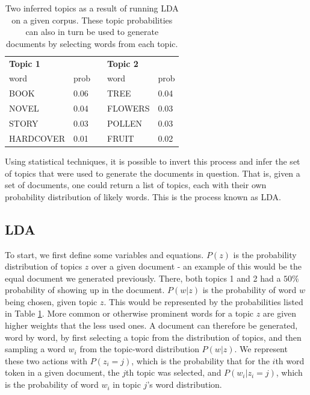 \documentclass[a4paper]{article}
\begin{document}
\begin{table}[h]
  \centering %
  \begin{tabular}{ |l|l|l|l|l| }
    \cline{0-1}
    \cline{4-5}
    \multicolumn{2}{|l|}{\textbf{Topic 1}} & & \multicolumn{2}{|l|}{\textbf{Topic 2}} \\
    \cline{0-1}
    \cline{4-5}
    word & prob & & word & prob \\
    \cline{0-1}
    \cline{4-5}
    BOOK & 0.06 & & TREE & 0.04 \\
    NOVEL & 0.04 & & FLOWERS & 0.03 \\
    STORY & 0.03 & & POLLEN & 0.03 \\
    HARDCOVER & 0.01 & & FRUIT & 0.02 \\
    \cline{0-1}
    \cline{4-5}
  \end{tabular}
  \caption{Two inferred topics as a result of running LDA on a given corpus. These topic probabilities can also in turn be used to generate documents by selecting words from each topic.}
  \label{tab:ldatopics}
\end{table}

Using statistical techniques, it is possible to invert this process and infer the set of topics that were used to generate the documents in question. That is, given a set of documents, one could return a list of topics, each with their own probability distribution of likely words. This is the process known as LDA.

\subsection{LDA}
To start, we first define some variables and equations. $P(z)$ is the probability distribution of topics $z$ over a given document - an example of this would be the equal document we generated previously. There, both topics 1 and 2 had a $50\%$ probability of showing up in the document. $P(w | z)$ is the probability of word $w$ being chosen, given topic $z$. This would be represented by the probabilities listed in Table \ref{tab:ldatopics}. More common or otherwise prominent words for a topic $z$ are given higher weights that the less used ones. A document can therefore be generated, word by word, by first selecting a topic from the distribution of topics, and then sampling a word $w_i$ from the topic-word distribution $P(w | z)$. We represent these two actions with $P(z_i = j)$, which is the probability that for the $i$th word token in a given document, the $j$th topic was selected, and $P(w_i | z_i = j)$, which is the probability of word $w_i$ in topic $j$'s word distribution.
\end{document}
